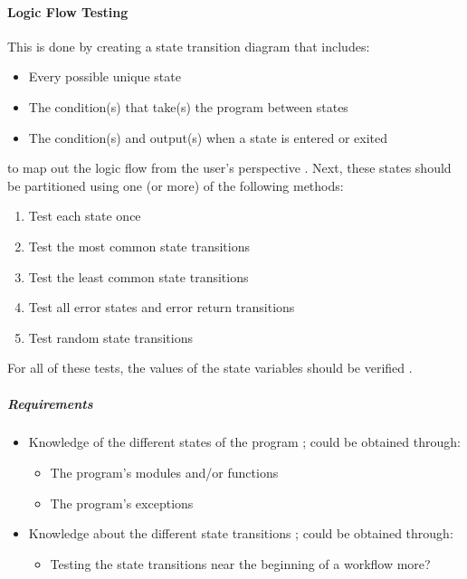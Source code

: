 \paragraph{Logic Flow Testing \cite[p.~80-84]{patton_software_2006}}

This is done by creating a state transition diagram that includes:

\begin{itemize}
      \item Every possible unique state
      \item The condition(s) that take(s) the program between states
      \item The condition(s) and output(s) when a state is entered or exited
\end{itemize}

to map out the logic flow from the user's perspective
\cite[p.~81-82]{patton_software_2006}. Next, these states should be
partitioned using one (or more) of the following methods:

\begin{enumerate}
      \item Test each state once
      \item Test the most common state transitions
      \item Test the least common state transitions
      \item Test all error states and error return transitions
      \item Test random state transitions
            \cite[p.~82-83]{patton_software_2006}
\end{enumerate}

For all of these tests, the values of the state variables should be verified
\cite[p.~83]{patton_software_2006}.

\subparagraph{Requirements}
\begin{itemize}
      \item Knowledge of the different states of the program
            \cite[p.~82]{patton_software_2006}; could be obtained through:
            \begin{itemize}
                  \item The program's modules and/or functions
                  \item The program's exceptions
            \end{itemize}
      \item Knowledge about the different state transitions
            \cite[p.~82]{patton_software_2006}; could be obtained through:
            \begin{itemize}
                  \item Testing the state transitions near the beginning of a
                        workflow more?
            \end{itemize}
\end{itemize}

